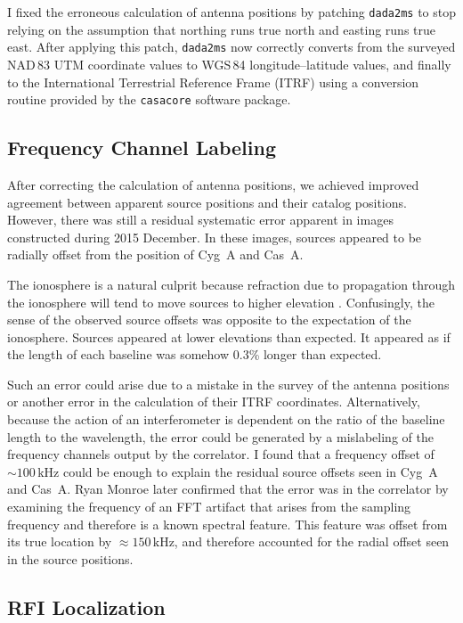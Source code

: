 \begin{bibunit}
I fixed the erroneous calculation of antenna positions by patching \texttt{dada2ms} to stop relying
on the assumption that northing runs true north and easting runs true east. After applying this
patch, \texttt{dada2ms} now correctly converts from the surveyed NAD\,83 UTM coordinate values to
WGS\,84 longitude--latitude values, and finally to the International Terrestrial Reference Frame
(ITRF) using a conversion routine provided by the \texttt{casacore} software package.

\subsection{Frequency Channel Labeling}

After correcting the calculation of antenna positions, we achieved improved agreement between
apparent source positions and their catalog positions. However, there was still a residual
systematic error apparent in images constructed during 2015 December. In these images, sources
appeared to be radially offset from the position of Cyg~A and Cas~A.

The ionosphere is a natural culprit because refraction due to propagation through the ionosphere
will tend to move sources to higher elevation \citep[e.g.,][]{2014MNRAS.437.1056V}. Confusingly, the
sense of the observed source offsets was opposite to the expectation of the ionosphere. Sources
appeared at lower elevations than expected. It appeared as if the length of each baseline was
somehow 0.3\% longer than expected.

Such an error could arise due to a mistake in the survey of the antenna positions or another error
in the calculation of their ITRF coordinates. Alternatively, because the action of an interferometer
is dependent on the ratio of the baseline length to the wavelength, the error could be generated by
a mislabeling of the frequency channels output by the correlator. I found that a frequency offset of
$\sim 100\,\text{kHz}$ could be enough to explain the residual source offsets seen in Cyg~A and
Cas~A. Ryan Monroe later confirmed that the error was in the correlator by examining the frequency
of an FFT artifact that arises from the sampling frequency and therefore is a known spectral
feature. This feature was offset from its true location by $\approx150\,\text{kHz}$, and therefore
accounted for the radial offset seen in the source positions.

\subsection{RFI Localization}


\end{bibunit}
